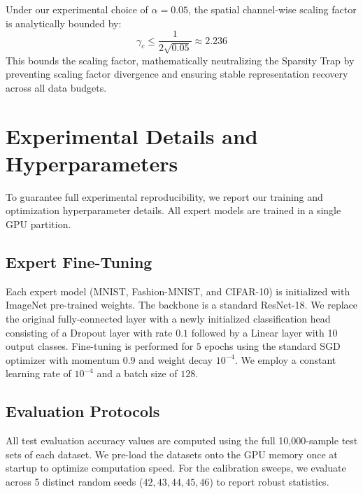 \documentclass{article}
\theoremstyle{plain}
\theoremstyle{definition}
\theoremstyle{remark}
\begin{document}
Under our experimental choice of $\alpha = 0.05$, the spatial channel-wise scaling factor is analytically bounded by:
\begin{equation}
\gamma_c \le \frac{1}{2\sqrt{0.05}} \approx 2.236
\end{equation}
This bounds the scaling factor, mathematically neutralizing the Sparsity Trap by preventing scaling factor divergence and ensuring stable representation recovery across all data budgets.

\section{Experimental Details and Hyperparameters}
To guarantee full experimental reproducibility, we report our training and optimization hyperparameter details. All expert models are trained in a single GPU partition.

\subsection{Expert Fine-Tuning}
Each expert model (MNIST, Fashion-MNIST, and CIFAR-10) is initialized with ImageNet pre-trained weights. The backbone is a standard ResNet-18. We replace the original fully-connected layer with a newly initialized classification head consisting of a Dropout layer with rate $0.1$ followed by a Linear layer with 10 output classes.
Fine-tuning is performed for $5$ epochs using the standard SGD optimizer with momentum $0.9$ and weight decay $10^{-4}$. We employ a constant learning rate of $10^{-4}$ and a batch size of $128$.

\subsection{Evaluation Protocols}
All test evaluation accuracy values are computed using the full 10,000-sample test sets of each dataset. We pre-load the datasets onto the GPU memory once at startup to optimize computation speed. For the calibration sweeps, we evaluate across 5 distinct random seeds ($42, 43, 44, 45, 46$) to report robust statistics.



\end{document}
